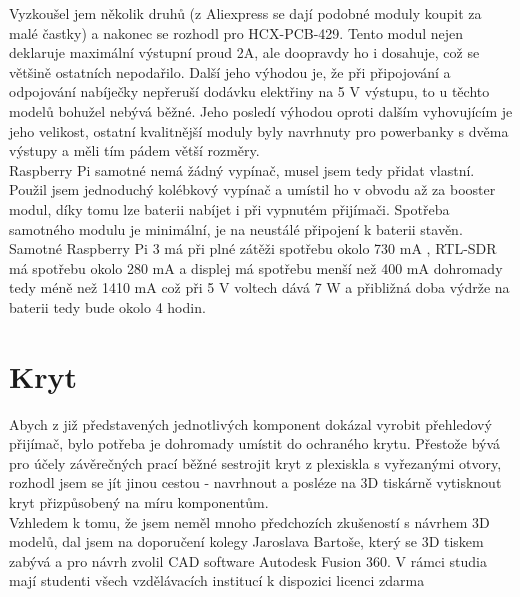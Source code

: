 \documentclass{ctuthesis}
\begin{document}
 Vyzkoušel jem několik druhů (z Aliexpress se dají podobné moduly koupit za malé častky) a nakonec se rozhodl pro HCX-PCB-429. Tento modul nejen deklaruje maximální výstupní proud 2A, ale doopravdy ho i dosahuje, což se většině ostatních nepodařilo. Další jeho výhodou je, že při připojování a odpojování nabíječky nepřeruší dodávku elektřiny na 5 V výstupu, to u těchto modelů bohužel nebývá běžné. Jeho posledí výhodou oproti dalším vyhovujícím je jeho velikost, ostatní kvalitnější moduly byly navrhnuty pro powerbanky s dvěma výstupy a měli tím pádem větší rozměry. \\
 Raspberry Pi samotné nemá žádný vypínač, musel jsem tedy přidat vlastní. Použil jsem jednoduchý kolébkový vypínač a umístil ho v obvodu až za booster modul, díky tomu lze baterii nabíjet i při vypnutém přijímači. Spotřeba samotného modulu je minimální, je na neustálé připojení k baterii stavěn.\\
 Samotné Raspberry Pi 3 má při plné zátěži spotřebu okolo 730 mA \cite{powerpi}, RTL-SDR má spotřebu okolo 280 mA \cite{rtlsdrcom}a displej má spotřebu menší než 400 mA \cite{powerLCD} dohromady tedy méně než 1410 mA což při 5 V voltech dává 7 W a přibližná doba výdrže na baterii tedy bude okolo 4 hodin.
 
\section{Kryt}
Abych z již představených jednotlivých komponent dokázal vyrobit přehledový přijímač, bylo potřeba je dohromady umístit do ochraného krytu. Přestože bývá pro účely závěrečných prací běžné sestrojit kryt z plexiskla s vyřezanými otvory, rozhodl jsem se jít jinou cestou - navrhnout a posléze na 3D tiskárně vytisknout kryt přizpůsobený na míru komponentům. \\
Vzhledem k tomu, že jsem neměl mnoho předchozích zkušeností s návrhem 3D modelů, dal jsem na doporučení kolegy Jaroslava Bartoše, který se 3D tiskem zabývá a pro návrh zvolil CAD software Autodesk Fusion 360. V rámci studia mají studenti všech vzdělávacích institucí k dispozici licenci zdarma
\end{document}

